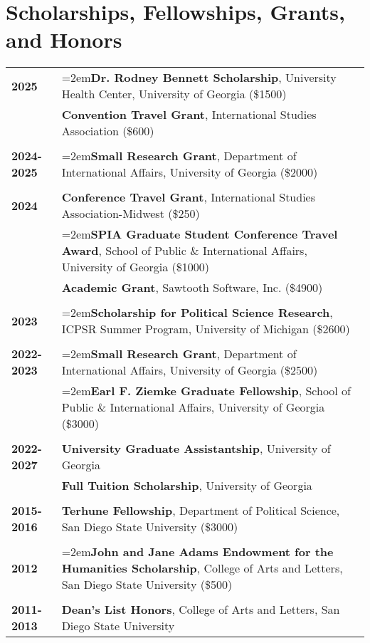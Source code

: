 \documentclass[letterpaper,12pt]{article}
\begin{document}
\section{Scholarships, Fellowships, Grants, and Honors}
\begin{xltabular}{\dimexpr\textwidth-0in}{p{.85in}X}
\textbf{2025}          & \hangindent=2em\textbf{Dr. Rodney Bennett Scholarship}, University Health Center, University of Georgia (\$1500)\\
                              & \textbf{Convention Travel Grant}, International Studies Association (\$600)\\ \\
\textbf{2024-2025} & \hangindent=2em\textbf{Small Research Grant}, Department of International Affairs, University of Georgia (\$2000)\\ \\
\textbf{2024}          & \textbf{Conference Travel Grant}, International Studies Association-Midwest (\$250)\\
                              & \hangindent=2em\textbf{SPIA Graduate Student Conference Travel Award}, School of Public \& \mbox{International} Affairs, University of Georgia (\$1000)\\
                              & \textbf{Academic Grant}, Sawtooth Software, Inc. (\$4900)\\ \\
\textbf{2023}          & \hangindent=2em\textbf{Scholarship for Political Science Research}, ICPSR Summer Program, University of \mbox{Michigan} (\$2600)\\ \\
\textbf{2022-2023} & \hangindent=2em\textbf{Small Research Grant}, Department of International Affairs, University of Georgia (\$2500)\\
                              & \hangindent=2em\textbf{Earl F. Ziemke Graduate Fellowship}, School of Public \& International Affairs, \mbox{University} of Georgia (\$3000)\\ \\
\textbf{2022-2027} & \textbf{University Graduate Assistantship}, University of Georgia\\
                              & \textbf{Full Tuition Scholarship}, University of Georgia\\ \\
\textbf{2015-2016} & \textbf{Terhune Fellowship}, Department of Political Science, San Diego State University (\$3000)\\ \\
\textbf{2012}          & \hangindent=2em\textbf{John and Jane Adams Endowment for the Humanities Scholarship}, College of Arts and Letters, San Diego State University (\$500)\\ \\
\textbf{2011-2013} & \textbf{Dean's List Honors}, College of Arts and Letters, San Diego State University
\end{xltabular}
\end{document}

